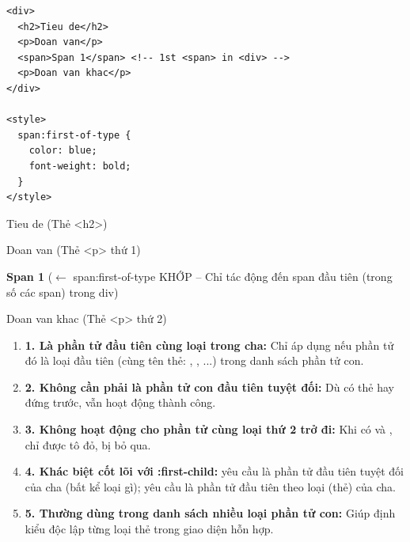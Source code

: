 \begin{codeWindow}
\begin{lstlisting}[language=HTML5]
<div>
  <h2>Tieu de</h2>
  <p>Doan van</p>
  <span>Span 1</span> <!-- 1st <span> in <div> -->
  <p>Doan van khac</p>
</div>

<style>
  span:first-of-type {
    color: blue;
    font-weight: bold;
  }
</style>
\end{lstlisting}
\end{codeWindow}

\begin{browserWindow}
\sffamily\small
Tieu de {\scriptsize\textcolor{gray!60}{(Thẻ <h2>)}} \par\vspace{2pt}
Doan van {\scriptsize\textcolor{gray!60}{(Thẻ <p> thứ 1)}} \par\vspace{2pt}
\textcolor{primaryBlue}{\textbf{Span 1}} {\scriptsize\textcolor{gray!60}{($\leftarrow$ span:first-of-type KHỚP -- Chỉ tác động đến span đầu tiên (trong số các span) trong div)}} \par\vspace{2pt}
Doan van khac {\scriptsize\textcolor{gray!60}{(Thẻ <p> thứ 2)}}
\end{browserWindow}

\begin{warnBox}
\begin{enumerate}[leftmargin=1.5em, itemsep=3pt, parsep=0pt]
    \item \textbf{1. Là phần tử đầu tiên cùng loại trong cha:} Chỉ áp dụng nếu phần tử đó là loại đầu tiên (cùng tên thẻ: , , ...) trong danh sách phần tử con.
    \item \textbf{2. Không cần phải là phần tử con đầu tiên tuyệt đối:} Dù có thẻ  hay  đứng trước,  vẫn hoạt động thành công.
    \item \textbf{3. Không hoạt động cho phần tử cùng loại thứ 2 trở đi:} Khi có  và , chỉ  được tô đỏ,  bị bỏ qua.
    \item \textbf{4. Khác biệt cốt lõi với :first-child:}  yêu cầu là phần tử đầu tiên tuyệt đối của cha (bất kể loại gì);  yêu cầu là phần tử đầu tiên theo loại (thẻ) của cha.
    \item \textbf{5. Thường dùng trong danh sách nhiều loại phần tử con:} Giúp định kiểu độc lập từng loại thẻ trong giao diện hỗn hợp.
\end{enumerate}
\end{warnBox}

